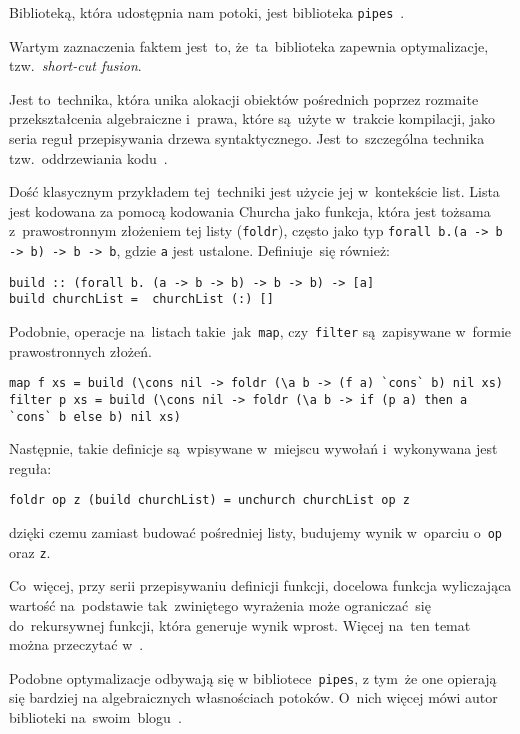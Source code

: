\documentclass[../../thesis.tex]{subfiles}
\begin{document}
Biblioteką, która udostępnia nam potoki, jest biblioteka \texttt{pipes}~\cite{Hackage:Pipes}.

Wartym zaznaczenia faktem jest~to, że~ta~biblioteka zapewnia optymalizacje,
tzw.~\emph{short-cut fusion}. 

Jest to~technika, która unika alokacji obiektów pośrednich poprzez rozmaite
przekształcenia algebraiczne i~prawa, które są~użyte w~trakcie kompilacji,
jako seria reguł przepisywania drzewa syntaktycznego. Jest to~szczególna
technika tzw.~oddrzewiania kodu~\cite{Gill:SCD}.

Dość klasycznym przykładem tej~techniki jest użycie jej w~kontekście list.
Lista jest kodowana za pomocą kodowania Churcha jako funkcja, która jest
tożsama z~prawostronnym złożeniem tej listy (\texttt{foldr}), często jako typ
\texttt{forall b.(a -> b -> b) -> b -> b}, gdzie \texttt{a}
jest ustalone.
Definiuje~się również:
\begin{verbatim}
build :: (forall b. (a -> b -> b) -> b -> b) -> [a]
build churchList =  churchList (:) []
\end{verbatim}

Podobnie, operacje na~listach takie~jak~\texttt{map}, czy~\texttt{filter} 
są~zapisywane w~formie prawostronnych złożeń.

\begin{verbatim}
map f xs = build (\cons nil -> foldr (\a b -> (f a) `cons` b) nil xs)
filter p xs = build (\cons nil -> foldr (\a b -> if (p a) then a `cons` b else b) nil xs)
\end{verbatim}

Następnie, takie definicje są~wpisywane w~miejscu wywołań i~wykonywana jest reguła:
\begin{verbatim}
foldr op z (build churchList) = unchurch churchList op z
\end{verbatim}
dzięki czemu zamiast budować pośredniej listy, budujemy wynik
w~oparciu o~\texttt{op} oraz \texttt{z}.

Co~więcej, przy serii przepisywaniu definicji funkcji, docelowa funkcja wyliczająca
wartość na~podstawie tak~zwiniętego wyrażenia może ograniczać~się do~rekursywnej funkcji,
która generuje wynik wprost. Więcej na~ten temat można przeczytać w~\cite{Gill:SCD}.

Podobne optymalizacje odbywają się w bibliotece~\texttt{pipes}, z tym~że one opierają się
bardziej na algebraicznych własnościach potoków. O~nich więcej mówi autor biblioteki
na~swoim~blogu~\cite{Gonzalez:SFP}.
\end{document}
